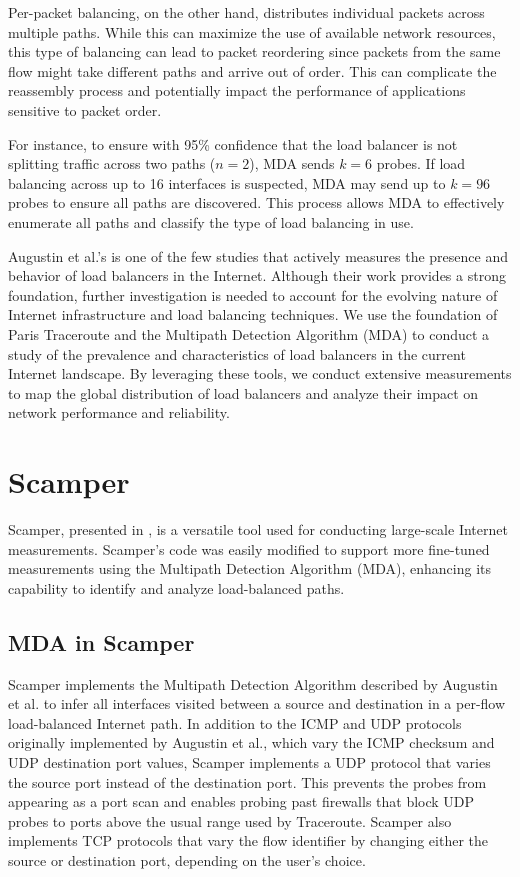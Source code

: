 \documentclass[12pt]{cwru_thesis}
\begin{document}
Per-packet balancing, on the other hand, distributes individual packets across multiple paths. While this can maximize the use of available network resources, this type of balancing can lead to packet reordering since packets from the same flow might take different paths and arrive out of order. This can complicate the reassembly process and potentially impact the performance of applications sensitive to packet order.

For instance, to ensure with 95\% confidence that the load balancer is not splitting traffic across two paths (\(n = 2\)), MDA sends \(k = 6\) probes. If load balancing across up to 16 interfaces is suspected, MDA may send up to \(k = 96\) probes to ensure all paths are discovered. This process allows MDA to effectively enumerate all paths and classify the type of load balancing in use.


Augustin et al.'s \cite{augustin2010measuring} is one of the few studies that actively measures the presence and behavior of load balancers in the Internet. Although their work provides a strong foundation, further investigation is needed to account for the evolving nature of Internet infrastructure and load balancing techniques. We use the foundation of Paris Traceroute and the Multipath Detection Algorithm (MDA) to conduct a study of the prevalence and characteristics of load balancers in the current Internet landscape. By leveraging these tools, we conduct extensive measurements to map the global distribution of load balancers and analyze their impact on network performance and reliability.



\section{Scamper}

Scamper, presented in  \cite{luckie2010scamper}, is a versatile tool used for conducting large-scale Internet measurements. Scamper's code was easily modified to support more fine-tuned measurements using the Multipath Detection Algorithm (MDA), enhancing its capability to identify and analyze load-balanced paths.




\subsection{MDA in Scamper}

Scamper implements the Multipath Detection Algorithm described by Augustin et al. to infer all interfaces visited between a source and destination in a per-flow load-balanced Internet path. In addition to the ICMP and UDP protocols originally implemented by Augustin et al., which vary the ICMP checksum and UDP destination port values, Scamper implements a UDP protocol that varies the source port instead of the destination port. This prevents the probes from appearing as a port scan and enables probing past firewalls that block UDP probes to ports above the usual range used by Traceroute. Scamper also implements TCP protocols that vary the flow identifier by changing either the source or destination port, depending on the user’s choice.
\end{document}
